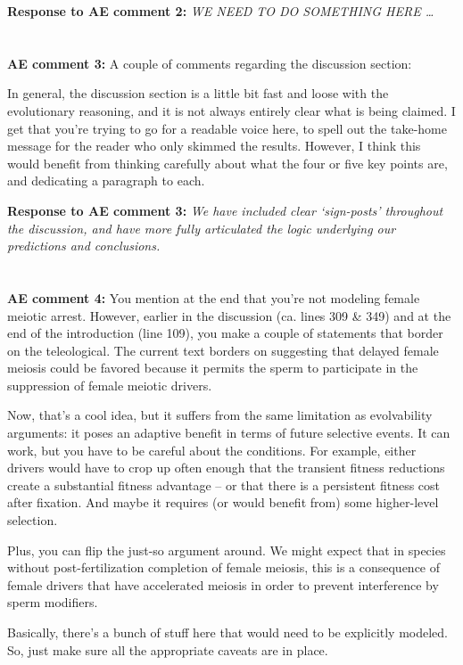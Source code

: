 \documentclass[12pt,letterpaper]{article}
\begin{document}
{\bf{Response to AE comment 2:}}  \emph{WE NEED TO DO SOMETHING HERE \dots{}}
\\
\\
\\
{\bf{AE comment 3:}} 
A couple of comments regarding the discussion section:

In general, the discussion section is a little bit fast and loose with the evolutionary reasoning, and it is not always entirely clear what is being claimed. I get that you're trying to go for a readable voice here, to spell out the take-home message for the reader who only skimmed the results. However, I think this would benefit from thinking carefully about what the four or five key points are, and dedicating a paragraph to each.

{\bf{Response to AE comment 3:}}  \emph{We have included clear `sign-posts' throughout the discussion, and have more fully articulated the logic underlying our predictions and conclusions.}
\\
\\
\\
{\bf{AE comment 4:}} 
You mention at the end that you're not modeling female meiotic arrest. However, earlier in the discussion (ca. lines 309 \& 349) and at the end of the introduction (line 109), you make a couple of statements that border on the teleological. The current text borders on suggesting that delayed female meiosis could be favored because it permits the sperm to participate in the suppression of female meiotic drivers.

Now, that's a cool idea, but it suffers from the same limitation as evolvability arguments: it poses an adaptive benefit in terms of future selective events. It can work, but you have to be careful about the conditions. For example, either drivers would have to crop up often enough that the transient fitness reductions create a substantial fitness advantage -- or that there is a persistent fitness cost after fixation. And maybe it requires (or would benefit from) some higher-level selection.

Plus, you can flip the just-so argument around. We might expect that in species without post-fertilization completion of female meiosis, this is a consequence of female drivers that have accelerated meiosis in order to prevent interference by sperm modifiers.

Basically, there's a bunch of stuff here that would need to be explicitly modeled. So, just make sure all the appropriate caveats are in place.
\end{document}
